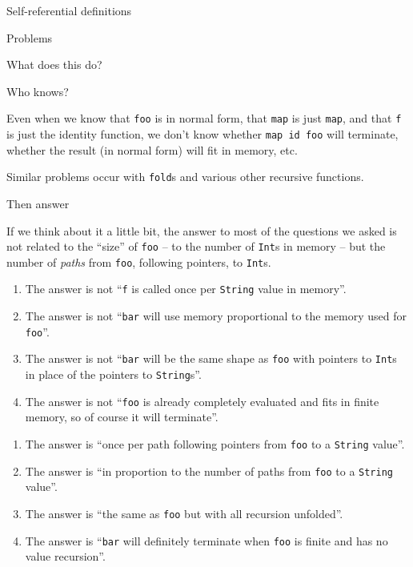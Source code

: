 \documentclass[ignorenonframetext]{beamer}
\begin{document}
\begin{frame}{Self-referential definitions}
\begin{frame}[fragile]{%
\protect\hypertarget{problems}{%
Problems}}
\begin{frame}{What does this do?}
\end{frame}

\begin{frame}{Who knows?}

Even when we know that \texttt{foo} is in normal form, that \texttt{map}
is just \texttt{map}, and that \texttt{f} is just the identity function,
we don’t know whether \texttt{map\ id\ foo} will terminate, whether the
result (in normal form) will fit in memory, etc.

Similar problems occur with \texttt{fold}s and various other recursive
functions.

\end{frame}

\begin{frame}{Then answer}

If we think about it a little bit, the answer to most of the questions
we asked is not related to the “size” of \texttt{foo} – to the number of
\texttt{Int}s in memory – but the number of \emph{paths} from
\texttt{foo}, following pointers, to \texttt{Int}s.

\begin{enumerate}
[1.]
\item
  The answer is not “\texttt{f} is called once per \texttt{String} value
  in memory”.
\item
  The answer is not “\texttt{bar} will use memory proportional to the
  memory used for \texttt{foo}”.
\item
  The answer is not “\texttt{bar} will be the same shape as \texttt{foo}
  with pointers to \texttt{Int}s in place of the pointers to
  \texttt{String}s”.
\item
  The answer is not “\texttt{foo} is already completely evaluated and
  fits in finite memory, so of course it will terminate”.
\end{enumerate}

\end{frame}

\end{frame}

\begin{frame}[fragile]

\begin{enumerate}
[1.]
\item
  The answer is “once per path following pointers from \texttt{foo} to a
  \texttt{String} value”.
\item
  The answer is “in proportion to the number of paths from \texttt{foo}
  to a \texttt{String} value”.
\item
  The answer is “the same as \texttt{foo} but with all recursion
  unfolded”.
\item
  The answer is “\texttt{bar} will definitely terminate when
  \texttt{foo} is finite and has no value recursion”.
\end{enumerate}


\end{frame}
\end{frame}
\end{document}
